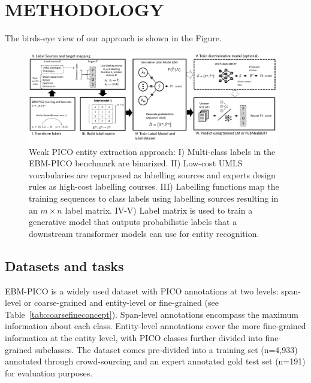\documentclass[10.7pt,]{article}
\begin{document}
\section{METHODOLOGY}\label{methods}
%
The birds-eye view of our approach is shown in the Figure.
%
\begin{figure}[ht]
\centering
\includegraphics[width=0.98\textwidth]{figures/approach.pdf}
\caption{Weak PICO entity extraction approach: I) Multi-class labels in the EBM-PICO benchmark are binarized. II) Low-cost UMLS vocabularies are repurposed as labelling sources and experts design rules as high-cost labelling courses. III) Labelling functions map the training sequences to class labels using labelling sources resulting in an $m \times n$ label matrix. IV-V) Label matrix is used to train a generative model that outputs probabilistic labels that a downstream transformer models can use for entity recognition.}
\label{fig:approach}
\end{figure}
%
%
%
\subsection{Datasets and tasks}\label{data}
%
EBM-PICO is a widely used dataset with PICO annotations at two levels: span-level or coarse-grained and entity-level or fine-grained (see Table~\ref{tab:coarsefineconcept}).
Span-level annotations encompass the maximum information about each class.
Entity-level annotations cover the more fine-grained information at the entity level, with PICO classes further divided into fine-grained subclasses.
The dataset comes pre-divided into a training set (n=4,933) annotated through crowd-sourcing and an expert annotated gold test set (n=191) for evaluation purposes.
\end{document}
